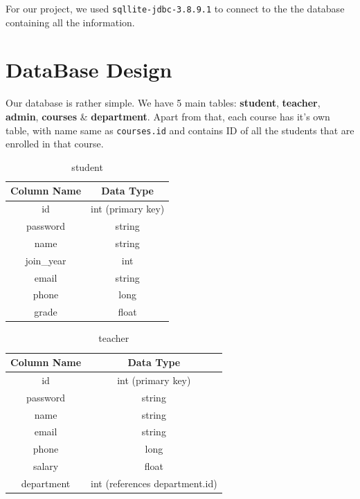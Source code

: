 \documentclass[12pt, a4paper]{article}
\begin{document}
For our project, we used \lstinline{sqllite-jdbc-3.8.9.1} to connect to the the database containing all the information.

\section{DataBase Design}

Our database is rather simple. We have 5 main tables: \textbf{student}, \textbf{teacher}, \textbf{admin}, \textbf{courses} \& \textbf{department}. Apart from that, each course has it's own table, with name same as \lstinline{courses.id} and contains ID of all the students that are enrolled in that course.

\vspace*{3em}

\begin{table}[H]
	\begin{center}
	\begin{tabular}{c|c}
	\textbf{Column Name} & \textbf{Data Type} \\
	\hline
	id & int (primary key) \\
	password & string \\
	name & string \\
	join\_year & int \\
	email & string \\
	phone & long \\
	grade & float
	\end{tabular}
	\end{center}
	\caption{student}
\end{table}

\newpage

\begin{table}[H]
	\begin{center}
	\begin{tabular}{c|c}
	\textbf{Column Name} & \textbf{Data Type} \\
	\hline
	id & int (primary key) \\
	password & string \\
	name & string \\
	email & string \\
	phone & long \\
	salary & float \\
	department & int (references department.id)
	\end{tabular}
	\end{center}
	\caption{teacher}
\end{table}
\end{document}
